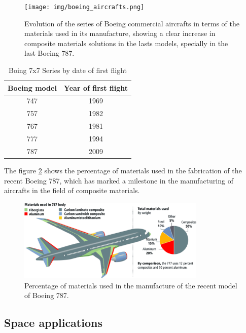 \begin{figure}[h]
	\centering
	\texttt{[image: img/boeing\_aircrafts.png]}
	\caption[Carbon fiber prepreg roll]{Evolution of the
	series of Boeing commercial aircrafts in terms of the materials used in
	its manufacture, showing a clear increase in composite materials solutions
	in the lasts models, specially in the last Boeing 787. \cite{Zhang2018}}
	\label{fig:boeing_evolution}
\end{figure}


\begin{table}[h]
\centering
\begin{tabular}{cc}
\hline
Boeing model & Year of first flight \\ \hline
747 & 1969 \\
757 & 1982 \\
767 & 1981 \\
777 & 1994 \\
787 & 2009 \\
\hline
\end{tabular}
\caption{Boing 7x7 Series by date of first flight}
\label{tab:boeing_years}
\end{table}

The figure \ref{fig:boeing787} shows the percentage of materials used in the
fabrication of the recent Boeing 787, which has marked a milestone in the
manufacturing of aircrafts in the field of composite materials.\\

\begin{figure}[h]
	\centering
	\includegraphics[width=0.8\textwidth]{img/boeing_787.png}
	\caption[Materials used in Boeing 787]{Percentage of materials
	used in the manufacture of the recent model of Boeing 787. \cite{Lobee2014}}
	\label{fig:boeing787}
\end{figure}

\subsection{Space applications}

